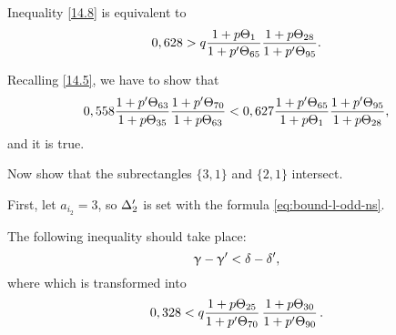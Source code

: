 Inequality \ref{14.8} is equivalent to
\begin{equation}
	0,628 > q
	\dfrac{1 + p\Theta_{1}}{1 + p'\Theta_{65}}
	\dfrac{1 + p\Theta_{28}}{1 + p'\Theta_{95}}.
\end{equation}

Recalling \ref{14.5}, we have to show that
\begin{equation*}
	0,558
	\dfrac{1 + p'\Theta_{63}}{1 + p\Theta_{35}}
	\dfrac{1 + p'\Theta_{70}}{1 + p\Theta_{63}}
	< 0,627
	\dfrac{1 + p'\Theta_{65}}{1 + p\Theta_{1}}
	\dfrac{1 + p'\Theta_{95}}{1 + p\Theta_{28}},
\end{equation*}
and it is true.

Now show that the subrectangles $\{3,1\}$ and $\{2, 1\}$ intersect.

First, let $a_{i_2} = 3$, so $\Delta_2'$ is set with the formula \ref{eq:bound-l-odd-ns}.

The following inequality should take place:
\begin{equation*}
	\upgamma - \upgamma' < \delta - \delta',
\end{equation*}
where
which is transformed into
\begin{equation}
	0,328 < q \dfrac{1 + p \Theta_{25}}{1 + p' \Theta_{70}}\, \dfrac{1 + p \Theta_{30}}{1 + p' \Theta_{90}}\,.
\end{equation}

